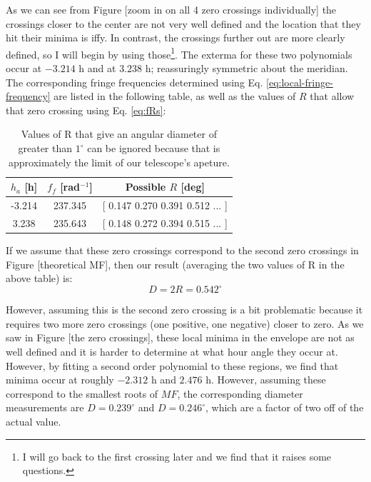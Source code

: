 \documentclass[12pt]{article}
\begin{document}
As we can see from Figure [zoom in on all 4 zero crossings individually]
the crossings closer to the center are not very well defined and the location that they hit their minima is iffy. In contrast, the crossings further out are more clearly defined, so I will begin by using those\footnote{I will go back to the first crossing later and we find that it raises some questions.}. The exterma for these two polynomials occur at $-3.214$ h and at $3.238$ h; reassuringly symmetric about the meridian. The corresponding fringe frequencies determined using Eq. \ref{eq:local-fringe-frequency} are listed in the following table, as well as the values of $R$ that allow that zero crossing using Eq. \ref{eq:fRs}:
\begin{table}
\begin{center}
  \begin{tabular}{c | c | c }
    $h_a$ [h] & $f_f$ [rad$^{-1}$] & Possible $R$ [deg]\\ \hline
    -3.214 & 237.345 & [ 0.147  0.270  0.391  0.512  ... ] \\
    3.238 & 235.643 &  [ 0.148  0.272  0.394  0.515  ... ] \\
    \end{tabular}
\end{center}
\caption{Values of R that give an angular diameter of greater than $1^\circ$ can be ignored because that is approximately the limit of our telescope's apeture.}
\label{tbl:firfrequencies}
\end{table}

If we assume that these zero crossings correspond to the second zero crossings in Figure [theoretical MF], then our result (averaging the two values of R in the above table) is:
\begin{equation}
D = 2R = 0.542^\circ \nonumber
\end{equation}

However, assuming this is the second zero crossing is a bit problematic because it requires two more zero crossings (one positive, one negative) closer to zero. As we saw in Figure [the zero crossings], these local minima in the envelope are not as well defined and it is harder to determine at what hour angle they occur at. However, by fitting a second order polynomial to these regions, we find that minima occur at roughly $-2.312$ h and $2.476$ h. However, assuming these correspond to the smallest roots of $MF$, the corresponding diameter measurements are $D = 0.239^\circ$ and $D = 0.246^\circ$, which are a factor of two off of the actual value.
\end{document}
